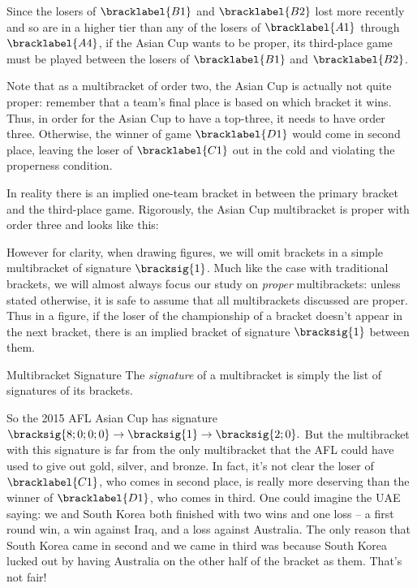 {    Since the losers of $\bracklabel{B1}$ and $\bracklabel{B2}$ lost more recently and so are in a higher tier than any of the losers of $\bracklabel{A1}$ through $\bracklabel{A4}$, if the Asian Cup wants to be proper, its third-place game must be played between the losers of $\bracklabel{B1}$ and $\bracklabel{B2}$.

    Note that as a multibracket of order two, the Asian Cup is actually not quite proper: remember that a team's final place is based on which bracket it wins. Thus, in order for the Asian Cup to have a top-three, it needs to have order three. Otherwise, the winner of game $\bracklabel{D1}$ would come in second place, leaving the loser of $\bracklabel{C1}$ out in the cold and violating the properness condition.

    In reality there is an implied one-team bracket in between the primary bracket and the third-place game. Rigorously, the Asian Cup multibracket is proper with order three and looks like this:


    However for clarity, when drawing figures, we will omit brackets in a simple multibracket of signature $\bracksig{1}$. Much like the case with traditional brackets, we will almost always focus our study on \textit{proper} multibrackets: unless stated otherwise, it is safe to assume that all multibrackets discussed are proper. Thus in a figure, if the loser of the championship of a bracket doesn't appear in the next bracket, there is an implied bracket of signature $\bracksig{1}$ between them.

    \begin{definition}{Multibracket Signature}{}
        The \textit{signature} of a multibracket is simply the list of signatures of its brackets.
    \end{definition}

    So the 2015 AFL Asian Cup has signature $\bracksig{8;0;0;0} \to \bracksig{1} \to \bracksig{2;0}.$ But the multibracket with this signature is far from the only multibracket that the AFL could have used to give out gold, silver, and bronze. In fact, it's not clear the loser of $\bracklabel{C1}$, who comes in second place, is really more deserving than the winner of $\bracklabel{D1}$, who comes in third. One could imagine the UAE saying: we and South Korea both finished with two wins and one loss -- a first round win, a win against Iraq, and a loss against Australia. The only reason that South Korea came in second and we came in third was because South Korea lucked out by having Australia on the other half of the bracket as them. That's not fair!

}
